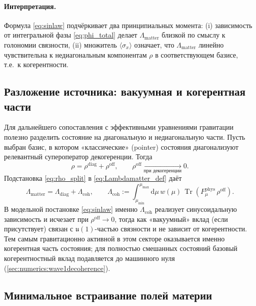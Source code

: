 \documentclass[11pt,a4paper]{article}
\DeclareMathOperator{\Tr}{Tr}
\newcommand{\dd}{\mathrm{d}}
\theoremstyle{definition}
\theoremstyle{plain}
\theoremstyle{remark}
\begin{document}
\paragraph{Интерпретация.}
Формула \eqref{eq:sinlaw} подчёркивает два принципиальных момента:
(i) зависимость от интегральной фазы \eqref{eq:phi_total} делает $\Lambda_{\mathrm{matter}}$ близкой по смыслу к голономии связности,
(ii) множитель $\langle\sigma_x\rangle$ означает, что $\Lambda_{\mathrm{matter}}$ линейно чувствительна к недиагональным компонентам
$\rho$ в соответствующем базисе, т.е.\ к когерентности.

\subsection{Разложение источника: вакуумная и когерентная части}
\label{sec:theory:split}

Для дальнейшего сопоставления с эффективными уравнениями гравитации полезно разделить состояние на диагональную и недиагональную части.
Пусть выбран базис, в котором «классические» (pointer) состояния диагонализуют релевантный супероператор декогеренции.
Тогда
\begin{equation}\label{eq:rho_split}
\rho = \rho^{\mathrm{diag}} + \rho^{\mathrm{off}},
\qquad
\rho^{\mathrm{off}}\xrightarrow[\text{при декогеренции}]{} 0.
\end{equation}
Подстановка \eqref{eq:rho_split} в \eqref{eq:Lambdamatter_def} даёт
\begin{equation}\label{eq:Lambda_split}
\Lambda_{\mathrm{matter}} = \Lambda_{\mathrm{diag}} + \Lambda_{\mathrm{coh}},
\qquad
\Lambda_{\mathrm{coh}}
:=
\int_{\mu_{\min}}^{\mu_{\max}}\dd\mu\, w(\mu)\,\Tr\!\left(F_{\mu}^{\mathrm{phys}}\,\rho^{\mathrm{off}}\right).
\end{equation}
В модельной постановке \eqref{eq:sinlaw} именно $\Lambda_{\mathrm{coh}}$ реализует синусоидальную зависимость и исчезает при $\rho^{\mathrm{off}}\to 0$,
тогда как «вакуумный» вклад (если присутствует) связан с $\mathfrak{u}(1)$-частью связности и не зависит от когерентности.
Тем самым гравитационно активной в этом секторе оказывается именно когерентная часть состояния;
для полностью смешанных состояний базовый когерентностный вклад подавляется до машинного нуля
(\cref{sec:numerics:wave1decoherence}).

\subsection{Минимальное встраивание полей материи}
\label{sec:theory:matter}
\end{document}
